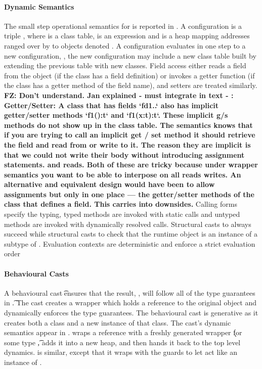 \documentclass[acmlarge, anonymous, authordraft]{acmart}
\newcommand{\FZ}[1]{\textbf{FZ: #1}}
\begin{document}
\paragraph{Dynamic Semantics}
The small  step operational semantics for \kafka is reported in .
 A configuration is a triple \K\e\s, where \K is a class
table, \e is an expression and \s is a heap mapping addresses ranged over by \a
to objects denoted \hspace{-1mm}\obj\C{\b\a}.  A configuration evaluates in one
step to a new configuration, \Reduce \K\e\s\Kp\ep\sp, the new configuration may
include a new class table built by extending the previous table with new
classes. Field access either reads a field from the object (if the class has a
field definition) or invokes a getter function (if the class has a getter method
of the field name), and setters are treated similarly. \FZ{Don't understand.  Jan explained - must integrate in text - : Getter/Setter:    A class that has fields `fd1..`  also has implicit getter/setter methods `f1():t` and `f1(x:t):t`.  These implicit g/s methods do not show up in the class table. The semantics knows that if you are trying to call an implicit get / set method it should retrieve the field and read from or write to it.
The reason they are implicit is that we could not write their body without introducing assignment statements.
and reads.
Both of these are tricky because under wrapper semantics you want to be able to interpose on all reads writes.
An alternative and equivalent design would have been to allow assignments but only in one place — the getter/setter methods of the class that defines a field.  This carries into downsides.
} 
Calling forms specify the
typing, typed methods are invoked with static calls and untyped methods are
invoked with dynamically resolved calls. Structural casts to \any always succeed
while structural casts to \C check that the runtime object is an instance of a
subtype of \C.  
Evaluation contexts are deterministic and enforce a strict evaluation order

\paragraph{Behavioural Casts}

A behavioural cast \BehCast\t\a ensures that the result, \ap, will follow
all of the type guarantees in \t. The cast creates a wrapper which holds a
reference to the original object \a and dynamically enforces the type
guarantees. The behavioural cast is generative as it creates both a class
and a new instance of that class. The cast's dynamic semantics appear in
.  wraps a reference \a with a freshly generated
wrapper \k for some type \t, adds it into a new heap, and then hands it back
to the top level dynamics.  is similar, except that it wraps
\a with the guards to let \a act like an instance of \any.
\end{document}
